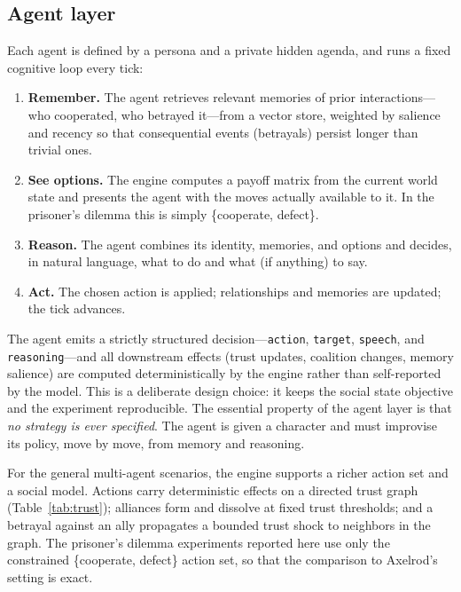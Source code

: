 \subsection{Agent layer}
Each agent is defined by a persona and a private hidden agenda, and runs a fixed cognitive loop every tick:
\begin{enumerate}
  \item \textbf{Remember.} The agent retrieves relevant memories of prior interactions---who cooperated, who betrayed it---from a vector store, weighted by salience and recency so that consequential events (betrayals) persist longer than trivial ones.
  \item \textbf{See options.} The engine computes a payoff matrix from the current world state and presents the agent with the moves actually available to it. In the prisoner's dilemma this is simply \{cooperate, defect\}.
  \item \textbf{Reason.} The agent combines its identity, memories, and options and decides, in natural language, what to do and what (if anything) to say.
  \item \textbf{Act.} The chosen action is applied; relationships and memories are updated; the tick advances.
\end{enumerate}
The agent emits a strictly structured decision---\texttt{action}, \texttt{target}, \texttt{speech}, and \texttt{reasoning}---and all downstream effects (trust updates, coalition changes, memory salience) are computed deterministically by the engine rather than self-reported by the model. This is a deliberate design choice: it keeps the social state objective and the experiment reproducible. The essential property of the agent layer is that \emph{no strategy is ever specified}. The agent is given a character and must improvise its policy, move by move, from memory and reasoning.

For the general multi-agent scenarios, the engine supports a richer action set and a social model. Actions carry deterministic effects on a directed trust graph (Table~\ref{tab:trust}); alliances form and dissolve at fixed trust thresholds; and a betrayal against an ally propagates a bounded trust shock to neighbors in the graph. The prisoner's dilemma experiments reported here use only the constrained \{cooperate, defect\} action set, so that the comparison to Axelrod's setting is exact.


